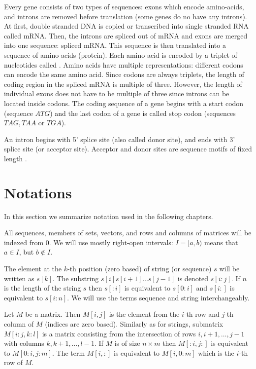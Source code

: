 Every gene consists of two types of sequences: exons which encode amino-acids,
and introns are removed before translation (some genes do no have any introns).
At first, double stranded DNA is copied or transcribed into single stranded RNA
called mRNA. Then, the introns are spliced out of mRNA and exons are merged into
one sequence: spliced mRNA. This sequence is then translated into a sequence of
amino-acids (protein). Each amino acid is encoded by a triplet of nucleotides
called . Amino acids have multiple representations: different
codons can encode the same amino acid. Since codons are always triplets, the
length of coding region in the  spliced mRNA is multiple of three. However, the
length of individual exons does not have to be multiple of three since introns
can be located inside codons.  The coding sequence of a gene begins with a start
codon (sequence $ATG$) and the last codon of a gene is called stop codon
(sequences $TAG,TAA$ or $TGA$).

An intron begins with 5' splice site (also called donor site),  and ends with 3'
splice site (or acceptor site).  Acceptor and donor sites are sequence motifs of
fixed length \cite{Pairagon2009,UnderstandingBioinformatics}.


\section{Notations}

In this section we summarize notation used in the following
chapters.

All sequences, members of sets, vectors, and rows and columns of matrices will
be indexed from $0$. We will use mostly right-open intervals: $I=[a,b)$ means
that $a\in I$, but $b\notin I$. 

The element at the $k$-th position (zero based) of string (or sequence) $s$ will
be written as $s[k]$. The substring $s[i]s[i+1]\dots s[j-1]$ is denoted
$s[i:j]$.  If $n$ is the length of the string $s$ then $s[:i]$ is equivalent to
$s[0:i]$ and $s[i:]$ is equivalent to $s[i:n]$.  We will use the terms sequence
and string interchangeably.

Let $M$ be a matrix. Then $M[i,j]$ is the element from the $i$-th row and $j$-th
column of $M$ (indices are zero based). Similarly as for strings, submatrix
$M[i:j,k:l]$ is a matrix consisting from the intersection of rows $i,i+1,\dots,
j-1$ with columns $k,k+1,\dots,l-1$. If $M$ is of size $n\times m$ then
$M[:i,j:]$ is equivalent to $M[0:i,j:m]$.  The term $M[i,:]$ is equivalent to
$M[i,0:m]$ which is the $i$-th row of $M$.
